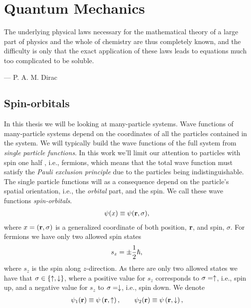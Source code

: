\chapter{Quantum Mechanics}
    \epigraph{The underlying physical laws necessary for the mathematical
    theory of a large part of physics and the whole of chemistry are thus
    completely known, and the difficulty is only that the exact application of
    these laws leads to equations much too complicated to be soluble.}
    {--- P. A. M. Dirac}

    \section{Spin-orbitals}
        In this thesis we will be looking at many-particle systems. Wave
        functions of many-particle systems depend on the coordinates of all the
        particles contained in the system. We will typically build the wave
        functions of the full system from \emph{single particle functions}. In
        this work we'll limit our attention to particles with spin one half ,
        i.e., fermions, which means that the total wave function must satisfy
        the \emph{Pauli exclusion principle} due to the particles being
        indistinguishable. The single particle functions will as a consequence
        depend on the particle's spatial orientation, i.e., the \emph{orbital}
        part, and the spin. We call these wave functions \emph{spin-orbitals}.
        \begin{align}
            \psi(x) \equiv \psi(\mathbf{r}, \sigma),
        \end{align}
        where $x = (\mathbf{r}, \sigma)$ is a generalized coordinate of both
        position, $\mathbf{r}$, and spin, $\sigma$. For fermions we have only two
        allowed spin states
        \begin{align}
            s_z = \pm \frac{1}{2}\hslash,
        \end{align}
        where $s_z$ is the spin along $z$-direction. As there are only two
        allowed states we have that $\sigma \in \left\{ \uparrow, \downarrow \right\}$,
        where a positive value for $s_z$ corresponds to $\sigma = \uparrow$,
        i.e., spin up, and a negative value for $s_z$ to $\sigma = \downarrow$,
        i.e., spin down.  We denote
        \begin{align}
            \psi_1(\mathbf{r}) \equiv \psi\left( \mathbf{r}, \uparrow \right),
            \qquad
            \psi_2(\mathbf{r}) \equiv \psi\left( \mathbf{r}, \downarrow \right),
        \end{align}

